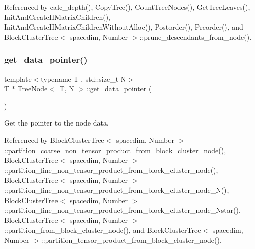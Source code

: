 Referenced by calc\+\_\+depth(), Copy\+Tree(), Count\+Tree\+Nodes(), Get\+Tree\+Leaves(), Init\+And\+Create\+H\+Matrix\+Children(), Init\+And\+Create\+H\+Matrix\+Children\+Without\+Alloc(), Postorder(), Preorder(), and Block\+Cluster\+Tree$<$ spacedim, Number $>$\+::prune\+\_\+descendants\+\_\+from\+\_\+node().

\mbox{\label{classTreeNode_aaa2ba047902c4e2fccffe3424a0c665b}} 
\subsubsection{\texorpdfstring{get\+\_\+data\+\_\+pointer()}{get\_data\_pointer()}\hspace{0.1cm}{\footnotesize\ttfamily [1/2]}}
{\footnotesize\ttfamily template$<$typename T , std\+::size\+\_\+t N$>$ \\
T $\ast$ \hyperlink{classTreeNode}{Tree\+Node}$<$ T, N $>$\+::get\+\_\+data\+\_\+pointer (\begin{DoxyParamCaption}{ }\end{DoxyParamCaption})}

Get the pointer to the node data. 

Referenced by Block\+Cluster\+Tree$<$ spacedim, Number $>$\+::partition\+\_\+coarse\+\_\+non\+\_\+tensor\+\_\+product\+\_\+from\+\_\+block\+\_\+cluster\+\_\+node(), Block\+Cluster\+Tree$<$ spacedim, Number $>$\+::partition\+\_\+fine\+\_\+non\+\_\+tensor\+\_\+product\+\_\+from\+\_\+block\+\_\+cluster\+\_\+node(), Block\+Cluster\+Tree$<$ spacedim, Number $>$\+::partition\+\_\+fine\+\_\+non\+\_\+tensor\+\_\+product\+\_\+from\+\_\+block\+\_\+cluster\+\_\+node\+\_\+\+N(), Block\+Cluster\+Tree$<$ spacedim, Number $>$\+::partition\+\_\+fine\+\_\+non\+\_\+tensor\+\_\+product\+\_\+from\+\_\+block\+\_\+cluster\+\_\+node\+\_\+\+Nstar(), Block\+Cluster\+Tree$<$ spacedim, Number $>$\+::partition\+\_\+from\+\_\+block\+\_\+cluster\+\_\+node(), and Block\+Cluster\+Tree$<$ spacedim, Number $>$\+::partition\+\_\+tensor\+\_\+product\+\_\+from\+\_\+block\+\_\+cluster\+\_\+node().

\mbox{\label{classTreeNode_ac6894ba6488ee38978ef2476366f6318}} 
